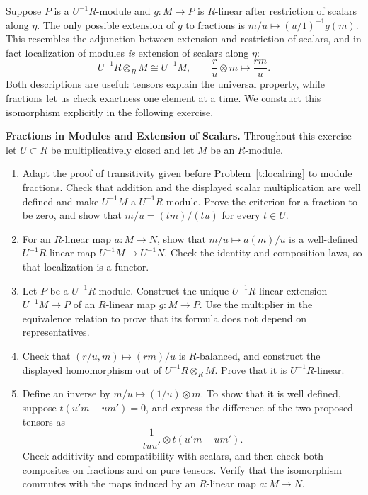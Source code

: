 \documentclass[12pt,reqno]{amsart}
\begin{document}
Suppose $P$ is a $U^{-1}R$-module and $g:M\to P$ is $R$-linear after restriction of scalars along $\eta$. The only possible extension of $g$ to fractions is $m/u\mapsto(u/1)^{-1}g(m)$. This resembles the adjunction between extension and restriction of scalars, and in fact localization of modules \emph{is} extension of scalars along $\eta$:
\[
U^{-1}R\otimes_RM\cong U^{-1}M,\qquad\frac ru\otimes m\longmapsto\frac{rm}u.
\]
Both descriptions are useful: tensors explain the universal property, while fractions let us check exactness one element at a time. We construct this isomorphism explicitly in the following exercise.

\hrulefill

\begin{problems}
\item\label{t:modulefractions} \textbf{Fractions in Modules and Extension of Scalars.} Throughout this exercise let $U\subset R$ be multiplicatively closed and let $M$ be an $R$-module.
\begin{enumerate}
\item Adapt the proof of transitivity given before Problem~\ref{t:localring} to module fractions. Check that addition and the displayed scalar multiplication are well defined and make $U^{-1}M$ a $U^{-1}R$-module. Prove the criterion for a fraction to be zero, and show that $m/u=(tm)/(tu)$ for every $t\in U$.
\item For an $R$-linear map $a:M\to N$, show that $m/u\mapsto a(m)/u$ is a well-defined $U^{-1}R$-linear map $U^{-1}M\to U^{-1}N$. Check the identity and composition laws, so that localization is a functor.
\item Let $P$ be a $U^{-1}R$-module. Construct the unique $U^{-1}R$-linear extension $U^{-1}M\to P$ of an $R$-linear map $g:M\to P$. Use the multiplier in the equivalence relation to prove that its formula does not depend on representatives.
\item Check that $(r/u,m)\mapsto(rm)/u$ is $R$-balanced, and construct the displayed homomorphism out of $U^{-1}R\otimes_RM$. Prove that it is $U^{-1}R$-linear.
\item Define an inverse by $m/u\mapsto(1/u)\otimes m$. To show that it is well defined, suppose $t(u'm-um')=0$, and express the difference of the two proposed tensors as
\[
\frac1{tuu'}\otimes t(u'm-um').
\]
Check additivity and compatibility with scalars, and then check both composites on fractions and on pure tensors. Verify that the isomorphism commutes with the maps induced by an $R$-linear map $a:M\to N$.
\end{enumerate}
\end{problems}
\end{document}
